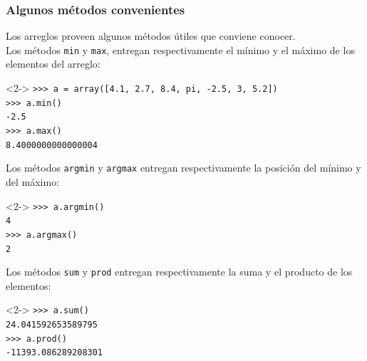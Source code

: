 \begin{frame}[fragile]
\frametitle{Algunos métodos convenientes}
Los arreglos proveen algunos métodos útiles que conviene conocer.
\\
\bigskip
Los métodos \texttt{min} y \texttt{max}, entregan respectivamente el mínimo y el máximo de los elementos del arreglo:
\begin{exampleblock}{}<2->
\verb|>>> a = array([4.1, 2.7, 8.4, pi, -2.5, 3, 5.2])| \\
\pause
\verb|>>> a.min()| \\
\pause
\verb|-2.5| \\
\pause
\verb|>>> a.max()| \\
\pause
\verb|8.4000000000000004|
\end{exampleblock}
\end{frame}
\begin{frame}[fragile]
Los métodos \texttt{argmin} y \texttt{argmax} entregan respectivamente la posición del mínimo y del máximo:
\begin{exampleblock}{}<2->
\verb|>>> a.argmin()| \\
\pause
\verb|4| \\
\pause
\verb|>>> a.argmax()| \\
\pause
\verb|2|
\end{exampleblock}
\end{frame}
\begin{frame}[fragile]
Los métodos \texttt{sum} y \texttt{prod} entregan respectivamente la suma y el producto de los elementos:
\begin{exampleblock}{}<2->
\verb|>>> a.sum()| \\
\pause
\verb|24.041592653589795| \\
\pause
\verb|>>> a.prod()| \\
\pause
\verb|-11393.086289208301|
\end{exampleblock}
\end{frame}

